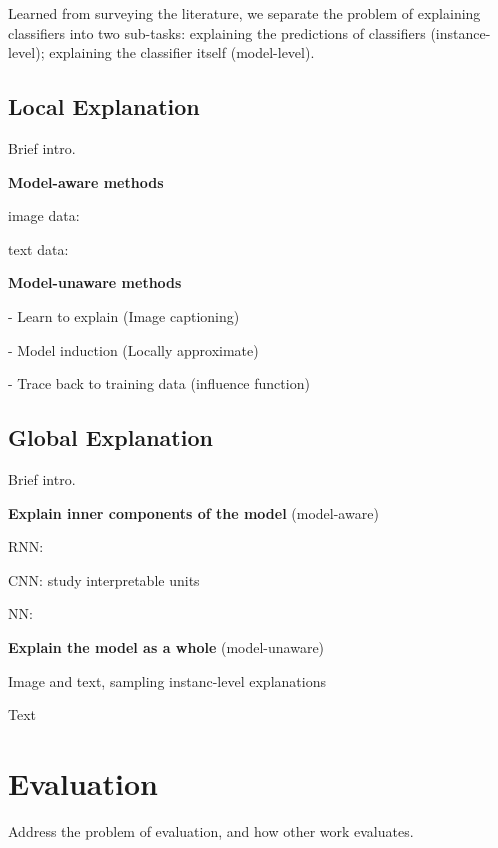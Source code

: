 Learned from surveying the literature, we separate the problem of explaining classifiers into two sub-tasks: explaining the predictions of classifiers (instance-level); explaining the classifier itself (model-level).



\subsection{Local Explanation}
Brief intro.

\textbf{Model-aware methods}

image data: \cite{simonyan14saliency,zeiler2014eccv,bach15plos,zintgraf17visualize}

text data: \cite{karpathy16rnn,li2016naccl-hlt,martens2014explaindocument,arras2017rnn-sentiment}

\textbf{Model-unaware methods}

  - Learn to explain (Image captioning) \cite{hendricks16generate}

  - Model induction (Locally approximate) \cite{ribeiro2016kdd}

  - Trace back to training data (influence function) \cite{pang2017influencefunctions}
 
\subsection{Global Explanation}
Brief intro.

\textbf{Explain inner components of the model} (model-aware) 

RNN: \cite{ming2017vast}

CNN: \cite{bau2017netdissect} study interpretable units

NN: \cite{feraud2002nn}

\textbf{Explain the model as a whole} (model-unaware) 

\cite{ribeiro2016kdd} Image and text, sampling instanc-level explanations

\cite{martens2014explaindocument} Text


\section{Evaluation}

Address the problem of evaluation, and how other work evaluates.

\newpage